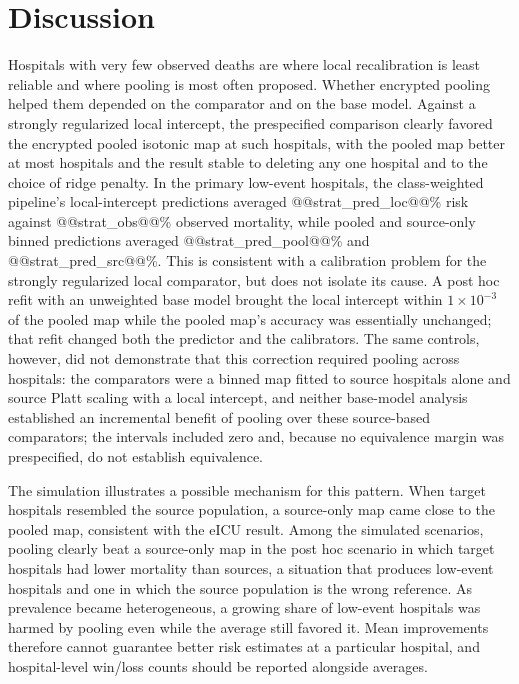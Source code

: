 \documentclass[11pt]{article}
\begin{document}
\section*{Discussion}
Hospitals with very few observed deaths are where local recalibration is least reliable and where pooling is most often proposed. Whether encrypted pooling helped them depended on the comparator and on the base model. Against a strongly regularized local intercept, the prespecified comparison clearly favored the encrypted pooled isotonic map at such hospitals, with the pooled map better at most hospitals and the result stable to deleting any one hospital and to the choice of ridge penalty. In the primary low-event hospitals, the class-weighted pipeline's local-intercept predictions averaged @@strat_pred_loc@@\% risk against @@strat_obs@@\% observed mortality, while pooled and source-only binned predictions averaged @@strat_pred_pool@@\% and @@strat_pred_src@@\%. This is consistent with a calibration problem for the strongly regularized local comparator, but does not isolate its cause. A post hoc refit with an unweighted base model brought the local intercept within $1\times10^{-3}$ of the pooled map while the pooled map's accuracy was essentially unchanged; that refit changed both the predictor and the calibrators. The same controls, however, did not demonstrate that this correction required pooling across hospitals: the comparators were a binned map fitted to source hospitals alone and source Platt scaling with a local intercept, and neither base-model analysis established an incremental benefit of pooling over these source-based comparators; the intervals included zero and, because no equivalence margin was prespecified, do not establish equivalence.

The simulation illustrates a possible mechanism for this pattern. When target hospitals resembled the source population, a source-only map came close to the pooled map, consistent with the eICU result. Among the simulated scenarios, pooling clearly beat a source-only map in the post hoc scenario in which target hospitals had lower mortality than sources, a situation that produces low-event hospitals and one in which the source population is the wrong reference. As prevalence became heterogeneous, a growing share of low-event hospitals was harmed by pooling even while the average still favored it. Mean improvements therefore cannot guarantee better risk estimates at a particular hospital, and hospital-level win/loss counts should be reported alongside averages.
\end{document}

